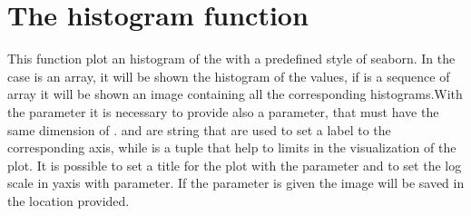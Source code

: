 \documentclass[letterpaper,10pt,english]{sphinxmanual}
\begin{document}
\section{The histogram function}
\label{\detokenize{index:the-histogram-function}}

\begin{fulllineitems}
\label{\detokenize{index:hicanalysis.visualizegraph.histogram}}
\pysigstartsignatures
{}
\pysigstopsignatures
\sphinxAtStartPar
This function plot an histogram of the  with a predefined  style 
of seaborn. In the case  is an array, it will be shown the histogram of 
the values, if  is a sequence of array it will be shown an image 
containing all the corresponding histograms.With the  parameter it is 
necessary to provide also a  parameter, that must have the same 
dimension of .  and  are string that are used to set a 
label to the corresponding axis, while  is a tuple that help to limits 
in the visualization of the plot. It is possible to set a title for the 
plot with the  parameter and to set the log scale in y\sphinxhyphen{}axis with 
 parameter.
If the parameter  is given the image will be saved in the location provided.



\end{fulllineitems}
\end{document}
